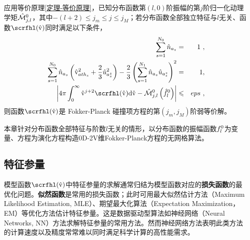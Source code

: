 \begin{corollary} \label{推论-等价原理-Khls}
    应用等价原理\ref{定理-等价原理}，已知分布函数第$(l,0)$阶振幅的第$j$阶归一化动理学矩${\hat{\mathcal{M}}}{_{j,l}^0}$，其中$ - (l+2) \le j_m \le j \le j_M$；若分布函数全部独立特征与$l$无关、函数$\scrfhl (\rmvh)$同时满足以下条件，
    \begin{eqnarray}
      \sum_{s=1}^{N_0} \nhas &=& 1 ~, \label{scrfl0snh}
      \\
      \sum_{s=1}^{N_0} \nhas \left(\vhaths^2 + \frac{2}{3} \uhazs^2 \right) - \frac{2}{3}  \left(\sum_{s=1}^{N_1} \nhas \uhazs \right)^2  &=& 1 , \label{scrfl0sKh}
      \\
     \left |4 \pi  \int_0^\infty \rmvh^{j+2} \scrfhl (\rmvh) \rmd \rmvh - \calMhjlo \left(\fhl \right) \right |  & \le & eps ~ , \label{scrfl0sj}
    \end{eqnarray}
则函数$\scrfhl (\rmvh)$是 Fokker-Planck 碰撞项方程的第$(j_m,j_M)$阶弱等价解。
\end{corollary}

本章针对分布函数全部特征与阶数$l$无关的情形，以分布函数的振幅函数$f_l^0$为变量、方程为演化方程构造0D-2V维Fokker-Planck方程的无网格算法。

\subsection{特征参量}
\label{特征参量}

模型函数$\scrfhl (\rmvh)$中特征参量的求解通常归结为模型函数对应的\textbf{损失函数}的最优化问题。\textbf{似然函数}是常用的损失函数；此时可用最大似然估计方法（Maximum Likelihood Estimation, MLE）、期望最大化算法（Expectation Maximization，EM）等优化方法估计特征参量。这是数据驱动型算法如神经网络（Neural Networks, NN）方法求解特征参量的常用方法。然而神经网络方法表明此类方法的计算速度以及精度常常难以同时满足科学计算的高性能需求。

